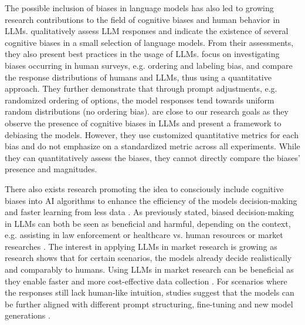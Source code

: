 \par The possible inclusion of biases in language models has also led to growing research contributions to the field of cognitive biases and human behavior in LLMs. \textcite{talboy2023challenging} qualitatively assess LLM responses and indicate the existence of several cognitive biases in a small selection of language models. From their assessments, they also present best practices in the usage of LLMs. \textcite{dominguez2023questioning} focus on investigating biases occurring in human surveys, e.g. ordering and labeling bias, and compare the response distributions of humans and LLMs, thus using a quantitative approach. They further demonstrate that through prompt adjustments, e.g. randomized ordering of options, the model responses tend towards uniform random distributions (no ordering bias). \textcite{echterhoff2024cognitive} are close to our research goals as they observe the presence of cognitive biases in LLMs and present a framework to debiasing the models. However, they use customized quantitative metrics for each bias and do not emphasize on a standardized metric across all experiments. While they can quantitatively assess the biases, they cannot directly compare the biases' presence and magnitudes.

\par There also exists research promoting the idea to consciously include cognitive biases into AI algorithms to enhance the efficiency of the models decision-making and faster learning from less data \parencite{hagendorff2024we, taniguchi2018machine}. As previously stated, biased decision-making in LLMs can both be seen as beneficial and harmful, depending on the context, e.g. assisting in law enforcement or healthcare vs. human resources or market researches \parencite{haltaufderheide2024ethics, zhao2023survey}. The interest in applying LLMs in market research is growing as research shows that for certain scenarios, the models already decide realistically and comparably to humans. Using LLMs in market research can be beneficial as they enable faster and more cost-effective data collection \parencite{brand2023using}. For scenarios where the responses still lack human-like intuition, studies suggest that the models can be further aligned with different prompt structuring, fine-tuning and new model generations \parencite{brand2023using, qiu2023much}.